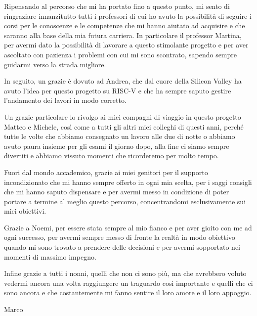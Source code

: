 \documentclass[%
  corpo=12pt,
  tipotesi=magistrale,
  evenboxes,
  twoside,
  english
]{toptesi}
\newcommand{\ooo}{out-of-order\xspace}
\newcommand{\riscv}{RISC-V\xspace}
\begin{document}
\begin{abstract}
This work is intended as an exploration of such complex \ooo architectures, to actually experience firsthand the main issues and tradeoffs designers must face and to contribute to the growing panorama of open source cores. Moreover, the common hope is for this project to serve as the basis for future in-house development of a complete \riscv-based platform here at Politecnico di Torino, which could be relevant both in teaching and research. As mentioned before, the entire work will be open sourced and available in a GitHub repository.
\end{abstract}

\italiano
\ringraziamenti
Ripensando al percorso che mi ha portato fino a questo punto, mi sento di ringraziare innanzitutto tutti i professori di cui ho avuto la possibilità di seguire i corsi per le conoscenze e le competenze che mi hanno aiutato ad acquisire e che saranno alla base della mia futura carriera. In particolare il professor Martina, per avermi dato la possibilità di lavorare a questo stimolante progetto e per aver ascoltato con pazienza i problemi con cui mi sono scontrato, sapendo sempre guidarmi verso la strada migliore.

In seguito, un grazie è dovuto ad Andrea, che dal cuore della Silicon Valley ha avuto l’idea per questo progetto su \riscv e che ha sempre saputo gestire l’andamento dei lavori in modo corretto.

Un grazie particolare lo rivolgo ai miei compagni di viaggio in questo progetto Matteo e Michele, così come a tutti gli altri miei colleghi di questi anni, perché tutte le volte che abbiamo consegnato un lavoro alle due di notte o abbiamo avuto paura insieme per gli esami il giorno dopo, alla fine ci siamo sempre divertiti e abbiamo vissuto momenti che ricorderemo per molto tempo.

Fuori dal mondo accademico, grazie ai miei genitori per il supporto incondizionato che mi hanno sempre offerto in ogni mia scelta, per i saggi consigli che mi hanno saputo dispensare e per avermi messo in condizione di poter portare a termine al meglio questo percorso, concentrandomi esclusivamente sui miei obiettivi.

Grazie a Noemi, per essere stata sempre al mio fianco e per aver gioito con me ad ogni successo, per avermi sempre messo di fronte la realtà in modo obiettivo quando mi sono trovato a prendere delle decisioni e per avermi sopportato nei momenti di massimo impegno.

Infine grazie a tutti i nonni, quelli che non ci sono più, ma che avrebbero voluto vedermi ancora una volta raggiungere un traguardo così importante e quelli che ci sono ancora e che costantemente mi fanno sentire il loro amore e il loro appoggio.
\vspace{1.5cm}
\begin{flushright}
  Marco
\end{flushright}

\english

\figurespagetrue
\tablespagetrue
\indici










\end{document}
